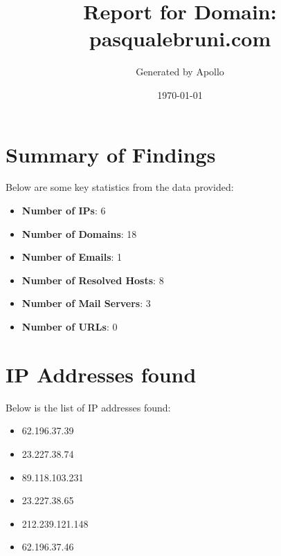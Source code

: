 \documentclass{article}
\title{Report for Domain: pasqualebruni.com}
\author{Generated by Apollo}
\date{\today}
\begin{document}
\maketitle
\clearpage

\tableofcontents  %

\clearpage

\section{Summary of Findings}

Below are some key statistics from the data provided:

\begin{itemize}
    \item \textbf{Number of IPs}: 6
    \item \textbf{Number of Domains}: 18
    \item \textbf{Number of Emails}: 1
    \item \textbf{Number of Resolved Hosts}: 8
    \item \textbf{Number of Mail Servers}: 3
    \item \textbf{Number of URLs}: 0
\end{itemize}

\clearpage

\section{IP Addresses found}

Below is the list of IP addresses found:


\begin{itemize}
    
        
            \item 62.196.37.39
        
            \item 23.227.38.74
        
            \item 89.118.103.231
        
            \item 23.227.38.65
        
            \item 212.239.121.148
        
            \item 62.196.37.46
        
    
\end{itemize}
\end{document}
